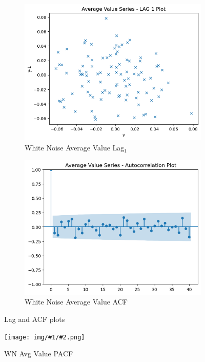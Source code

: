 \documentclass{article}
\newcommand{\fig}[3] {
\begin{figure}[H]
\centering
\texttt{[image: img/\#1/\#2.png]}
\caption{#3}
\label{figure:#1_#2}
\end{figure}
}
\begin{document}
\begin{figure}[htbp]
  \centering
  \begin{subfigure}[b]{0.45\textwidth}
    \includegraphics[width=\textwidth]{img/wn_average_value/lag_1.png}
    \caption{White Noise Average Value Lag$_1$}
    \label{fig:avgvaluelag}
  \end{subfigure}
  \hfill
  \begin{subfigure}[b]{0.45\textwidth}
    \includegraphics[width=\textwidth]{img/wn_average_value/acf.png}
    \caption{White Noise Average Value ACF}
    \label{fig:avgvalueacf}
  \end{subfigure}
  \caption{Lag and ACF plots}
  \label{fig:whitenoise3}
\end{figure}
\fig{wn_average_value}{pacf}{WN Avg Value PACF}
\end{document}
